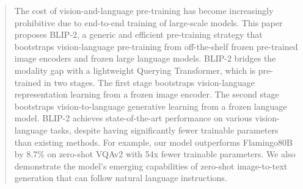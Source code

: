 \begin{abstract}

The cost of vision-and-language pre-training has become increasingly prohibitive due to end-to-end training of large-scale models.
This paper proposes BLIP-2, a generic and efficient pre-training strategy that bootstraps vision-language pre-training from off-the-shelf frozen pre-trained image encoders and frozen large language models.
BLIP-2 bridges the modality gap with a lightweight Querying Transformer, which is pre-trained in two stages.
The first stage bootstraps vision-language representation learning from a frozen image encoder.
The second stage bootstraps vision-to-language generative learning from a frozen language model.
BLIP-2 achieves state-of-the-art performance on various vision-language tasks,
despite having significantly fewer trainable parameters than existing methods.
For example,
our model outperforms Flamingo80B by 8.7\% on
zero-shot VQAv2 with 54x fewer trainable parameters.
We also demonstrate the model's emerging capabilities of zero-shot image-to-text generation that can follow natural language instructions.
\end{abstract}